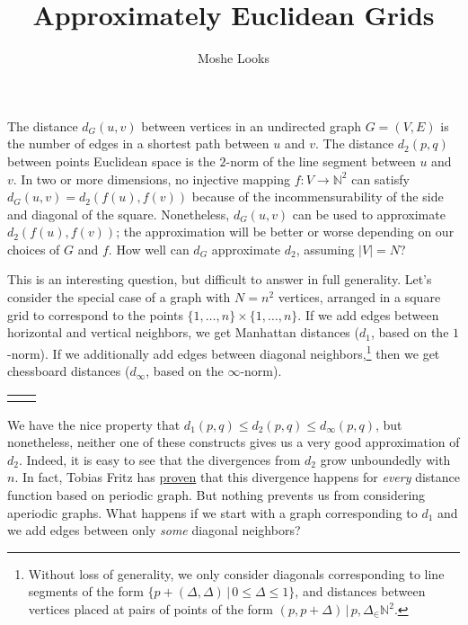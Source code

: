 \documentclass[letterpaper]{article}
\begin{document}
\title{Approximately Euclidean Grids}
\author{Moshe Looks}

\maketitle

The distance $d_G(u, v)$ between vertices in an undirected graph $G = (V, E)$ is the number
of edges in a shortest path between $u$ and $v$. The distance $d_2(p, q)$ between points
Euclidean space is the $2$-norm of the line segment between $u$ and $v$. In two or more
dimensions, no injective mapping $f : V \to \mathbb{N}^2$ can satisfy $d_G(u, v) = d_2(f(u),
f(v))$ because of the incommensurability of the side and diagonal of the square. Nonetheless,
$d_G(u, v)$ can be used to approximate $d_2(f(u), f(v))$; the approximation will be better or
worse depending on our choices of $G$ and $f$. How well can $d_G$ approximate $d_2$, assuming
$|V| = N$?

This is an interesting question, but difficult to answer in full generality. Let's consider
the special case of a graph with $N = n^2$ vertices, arranged in a square grid to correspond
to the points $\{1, \ldots, n\} \times \{1, \ldots, n\}$. If we add edges between horizontal
and vertical neighbors, we get Manhattan distances ($d_1$, based on the $1$-norm). If we
additionally add edges between diagonal neighbors,\footnote{Without loss of generality, we
only consider diagonals corresponding to line segments of the form $\{p + (\Delta, \Delta) \,
| \, 0 \leq \Delta \leq 1\}$, and distances between vertices placed at pairs of points of the
form $(p, p + \Delta) \, | \, p, \Delta _\in \mathbb{N}^2$.} then we get chessboard distances
($d_\infty$, based on the $\infty$-norm).

\setlength{\tabcolsep}{15pt}
\begin{tabular}{ l r}
   & 
\end{tabular}

We have the nice property that $d_1(p, q) \leq d_2(p, q) \leq d_\infty(p, q)$, but
nonetheless, neither one of these constructs gives us a very good approximation of
$d_2$. Indeed, it is easy to see that the divergences from $d_2$ grow unboundedly with $n$.
In fact, Tobias Fritz has \href{https://arxiv.org/abs/1109.1963}{proven} that this divergence
happens for \emph{every} distance function based on periodic graph. But nothing prevents us
from considering aperiodic graphs. What happens if we start with a graph corresponding to
$d_1$ and we add edges between only \emph{some} diagonal neighbors?
\end{document}
